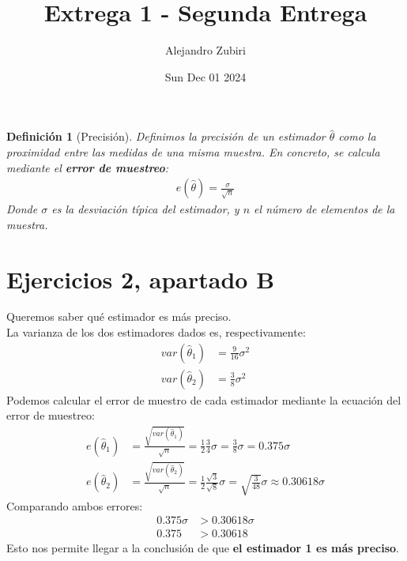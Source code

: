 \documentclass{article}
\author{Alejandro Zubiri}
\date{Sun Dec 01 2024}
\title{Extrega 1 - Segunda Entrega}
\newtheorem*{definicion}{Definición}
\begin{document}
\maketitle
\begin{definicion}[Precisión]
    Definimos la precisión de un estimador $\hat{\theta }$ como la proximidad entre las medidas
    de una misma muestra. En concreto, se calcula mediante el \textbf{error de muestreo}:
    \begin{equation}
        \begin{split}
            e(\hat{\theta }) = \frac{\sigma }{\sqrt{n}}
        \end{split}
    \end{equation}
    Donde $\sigma $ es la desviación típica del estimador, y $n$ el número de elementos de la
    muestra.
\end{definicion}
\section*{Ejercicios 2, apartado B}
    Queremos saber qué estimador es más preciso.\\
    La varianza de los dos estimadores dados es, respectivamente:
    \begin{equation}
        \begin{split}
            var (\hat{\theta }_1) &= \frac{9}{16} \sigma^{2}\\
            var (\hat{\theta }_2) &= \frac{3}{8}\sigma^{2}
        \end{split}
    \end{equation}
    Podemos calcular el error de muestro de cada estimador mediante la ecuación del error de
    muestreo:
    \begin{equation}
        \begin{split}
            e(\hat{\theta }_1) &= \frac{\sqrt{var (\hat{\theta }_1)}}{\sqrt{n}} =
            \frac{1}{2} \frac{3}{4} \sigma = \frac{3}{8}\sigma = 0.375\sigma  \\
            e(\hat{\theta }_2) &= \frac{\sqrt{var (\hat{\theta }_2)}}{\sqrt{n}}=
            \frac{1}{2} \frac{\sqrt{3}}{\sqrt{8}} \sigma  = \sqrt{\frac{3}{48}}\sigma
            \approx 0.30618\sigma 
        \end{split}
    \end{equation}
    Comparando ambos errores:
    \begin{equation}
        \begin{split}
            0.375\sigma &> 0.30618\sigma \\
            0.375 &> 0.30618
        \end{split}
    \end{equation}
    Esto nos permite llegar a la conclusión de que \textbf{el estimador 1 es más preciso}.
\end{document}
